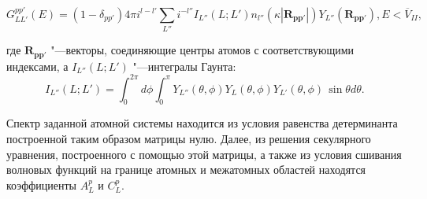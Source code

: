 \begin{equation}
  G_{LL'}^{pp'}(E) = (1 - \delta_{pp'}) 4 \pi i^{l - l'} \sum_{L''}{i^{-l''} I_{L''}(L; L')} n_{l''}(\kappa |\mathbf{R_{pp'}}|)
  Y_{L''}(\mathbf{R_{pp'}}), E < \overline{V}_{II},
\end{equation}

где $\mathbf{R_{pp'}}$ "---векторы, соединяющие центры атомов с соответствующими индексами, а $I_{L''}(L; L')$ "---интегралы
Гаунта:
\begin{equation}\label{eq:gaunt}
  I_{L''}(L; L') = \int_0^{2\pi} {d\phi \int_0^{\pi}{
  Y_{L''}(\theta, \phi) Y_{L}(\theta, \phi) Y_{L'}(\theta, \phi)
  \, \sin \theta d\theta
  }}.
\end{equation}

Спектр заданной атомной системы находится из условия равенства детерминанта построенной таким образом матрицы нулю.
Далее, из решения секулярного уравнения, построенного с помощью этой матрицы, а также из условия сшивания волновых
функций на границе атомных и межатомных областей находятся коэффициенты $A_L^p$ и $C_L^p$.

\FloatBarrier
